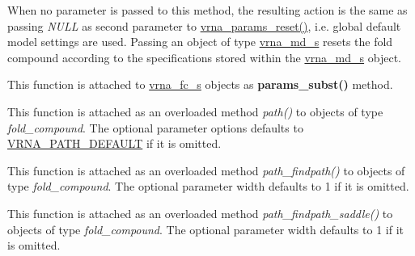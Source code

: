 \begin{DoxyRefList}
When no parameter is passed to this method, the resulting action is the same as passing {\itshape N\+U\+LL} as second parameter to \hyperlink{group__energy__parameters_gac40dc82e48a72a97cfc58b9da08a7792}{vrna\+\_\+params\+\_\+reset()}, i.\+e. global default model settings are used. Passing an object of type \hyperlink{group__model__details_structvrna__md__s}{vrna\+\_\+md\+\_\+s} resets the fold compound according to the specifications stored within the \hyperlink{group__model__details_structvrna__md__s}{vrna\+\_\+md\+\_\+s} object.  
\item[\label{wrappers__wrappers000079}%
\Hypertarget{wrappers__wrappers000079}%
Global \hyperlink{group__energy__parameters_ga5d1909208f7ea3baa98b75afaa1f62ca}{vrna\+\_\+params\+\_\+subst} (vrna\+\_\+fold\+\_\+compound\+\_\+t $\ast$vc, vrna\+\_\+param\+\_\+t $\ast$par)]This function is attached to \hyperlink{group__fold__compound_structvrna__fc__s}{vrna\+\_\+fc\+\_\+s} objects as {\bfseries params\+\_\+subst()} method.  
\item[\label{wrappers__wrappers000093}%
\Hypertarget{wrappers__wrappers000093}%
Global \hyperlink{group__paths_gab6aee4143f8b103518d5cbfe6bfe5eae}{vrna\+\_\+path} (vrna\+\_\+fold\+\_\+compound\+\_\+t $\ast$vc, short $\ast$pt, unsigned int steps, unsigned int options)]This function is attached as an overloaded method {\itshape path()} to objects of type {\itshape fold\+\_\+compound}. The optional parameter {\ttfamily options} defaults to \hyperlink{group__paths_gaf1bb1f8fec8d24e3b821f621b19f77b4}{V\+R\+N\+A\+\_\+\+P\+A\+T\+H\+\_\+\+D\+E\+F\+A\+U\+LT} if it is omitted.  
\item[\label{wrappers__wrappers000065}%
\Hypertarget{wrappers__wrappers000065}%
Global \hyperlink{group__direct__paths_ga4b2283c4142cafd99678495585fcc842}{vrna\+\_\+path\+\_\+findpath} (vrna\+\_\+fold\+\_\+compound\+\_\+t $\ast$vc, const char $\ast$s1, const char $\ast$s2, int width)]This function is attached as an overloaded method {\itshape path\+\_\+findpath()} to objects of type {\itshape fold\+\_\+compound}. The optional parameter {\ttfamily width} defaults to 1 if it is omitted.  
\item[\label{wrappers__wrappers000063}%
\Hypertarget{wrappers__wrappers000063}%
Global \hyperlink{group__direct__paths_gad611574a76593e26021f177e7854b6b4}{vrna\+\_\+path\+\_\+findpath\+\_\+saddle} (vrna\+\_\+fold\+\_\+compound\+\_\+t $\ast$vc, const char $\ast$s1, const char $\ast$s2, int width)]This function is attached as an overloaded method {\itshape path\+\_\+findpath\+\_\+saddle()} to objects of type {\itshape fold\+\_\+compound}. The optional parameter {\ttfamily width} defaults to 1 if it is omitted.  

\end{DoxyRefList}
